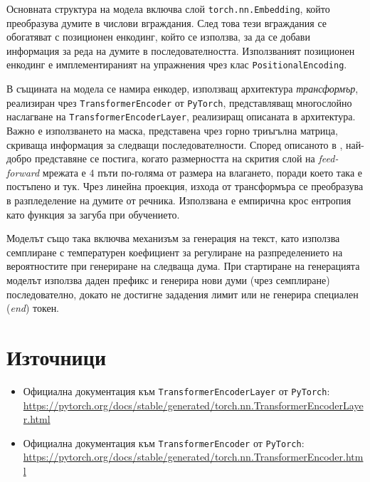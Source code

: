 \documentclass[12pt,oneside,a4paper]{article}
\begin{document}
	Основната структура на модела включва слой \texttt{torch.nn.Embedding}, който преобразува думите в числови вграждания. След това тези вграждания се обогатяват с позиционен енкодинг, който се използва, за да се добави информация за реда на думите в последователността. Използваният позиционен енкодинг е имплементираният на упражнения чрез клас \texttt{PositionalEncoding}.
	
	В същината на модела се намира енкодер, използващ архитектура \textit{трансформър}, реализиран чрез \texttt{TransformerEncoder} от \texttt{PyTorch}, представляващ многослойно наслагване на \texttt{TransformerEncoderLayer}, реализиращ описаната в  \textbf{\cite{vaswani2017attention}} архитектура. Важно е използването на маска, представена чрез горно триъгълна матрица, скриваща информация за следващи последователности. Според описаното в \textbf{\cite{vaswani2017attention}}, най-добро представяне се постига, когато размерността на скрития слой на \textit{feed-forward} мрежата е $4$ пъти по-голяма от размера на влагането, поради което така е постъпено и тук. Чрез линейна проекция, изхода от трансформъра се преобразува в разпледеление на думите от речника. Използвана е емпирична крос ентропия като функция за загуба при обучението.
	
	Моделът също така включва механизъм за генерация на текст, като използва семплиране с температурен коефициент за регулиране на разпределението на вероятностите при генериране на следваща дума. При стартиране на генерацията моделът използва даден префикс и генерира нови думи (чрез семплиране) последователно, докато не достигне зададения лимит или не генерира специален (\textit{end}) токен.
	
	
	\section{Източници}
	
	\begin{itemize}
		\item Официална документация към \texttt{TransformerEncoderLayer} от \texttt{PyTorch}:\\ \href{https://pytorch.org/docs/stable/generated/torch.nn.TransformerEncoderLayer.html}{https://pytorch.org/docs/stable/generated/torch.nn.TransformerEncoderLayer.html}
		\item Официална документация към \texttt{TransformerEncoder} от \texttt{PyTorch}:\\ \href{https://pytorch.org/docs/stable/generated/torch.nn.TransformerEncoder.html}{https://pytorch.org/docs/stable/generated/torch.nn.TransformerEncoder.html}
	\end{itemize}
	
\end{document}
